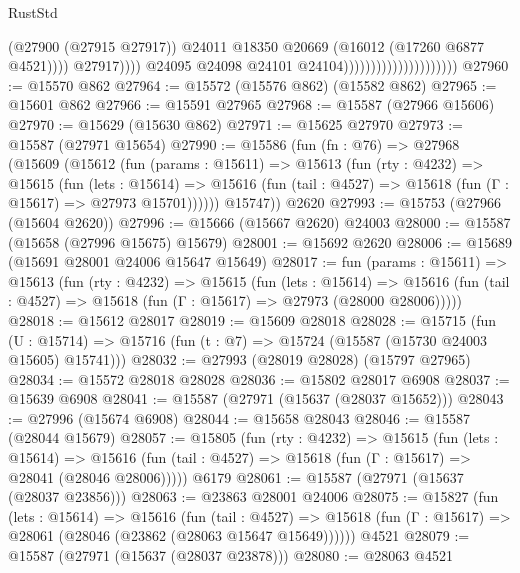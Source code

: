 \begin{lexlean}{RustStd}
\begin{coremodule}
                                                          (@27900 (@27915 @27917))
                                                          @24011
                                                          @18350
                                                          @20669
                                                          (@16012 (@17260 @6877 @4521))))
                                                      @27917))))
                                              @24095
                                              @24098
                                              @24101
                                              @24104)))))))))))))))))))))
@27960 := @15570 @862
@27964 := @15572 (@15576 @862) (@15582 @862)
@27965 := @15601 @862
@27966 := @15591 @27965
@27968 := @15587 (@27966 @15606)
@27970 := @15629 (@15630 @862)
@27971 := @15625 @27970
@27973 := @15587 (@27971 @15654)
@27990 := @15586
    (fun (fn : @76) =>
    @27968
      (@15609
        (@15612
          (fun (params : @15611) =>
          @15613
            (fun (rty : @4232) =>
            @15615
              (fun (lets : @15614) =>
              @15616 (fun (tail : @4527) => @15618 (fun (Γ : @15617) => @27973 @15701))))))
        @15747))
    @2620
@27993 := @15753 (@27966 (@15604 @2620))
@27996 := @15666 (@15667 @2620) @24003
@28000 := @15587 (@15658 (@27996 @15675) @15679)
@28001 := @15692 @2620
@28006 := @15689 (@15691 @28001 @24006 @15647 @15649)
@28017 := fun (params : @15611) =>
  @15613
    (fun (rty : @4232) =>
    @15615
      (fun (lets : @15614) =>
      @15616 (fun (tail : @4527) => @15618 (fun (Γ : @15617) => @27973 (@28000 @28006)))))
@28018 := @15612 @28017
@28019 := @15609 @28018
@28028 := @15715
    (fun (U : @15714) => @15716 (fun (t : @7) => @15724 (@15587 (@15730 @24003 @15605) @15741)))
@28032 := @27993 (@28019 @28028) (@15797 @27965)
@28034 := @15572 @28018 @28028
@28036 := @15802 @28017 @6908
@28037 := @15639 @6908
@28041 := @15587 (@27971 (@15637 (@28037 @15652)))
@28043 := @27996 (@15674 @6908)
@28044 := @15658 @28043
@28046 := @15587 (@28044 @15679)
@28057 := @15805
    (fun (rty : @4232) =>
    @15615
      (fun (lets : @15614) =>
      @15616 (fun (tail : @4527) => @15618 (fun (Γ : @15617) => @28041 (@28046 @28006)))))
    @6179
@28061 := @15587 (@27971 (@15637 (@28037 @23856)))
@28063 := @23863 @28001 @24006
@28075 := @15827
    (fun (lets : @15614) =>
    @15616
      (fun (tail : @4527) =>
      @15618 (fun (Γ : @15617) => @28061 (@28046 (@23862 (@28063 @15647 @15649))))))
    @4521
@28079 := @15587 (@27971 (@15637 (@28037 @23878)))
@28080 := @28063 @4521

\end{coremodule}
\end{lexlean}
